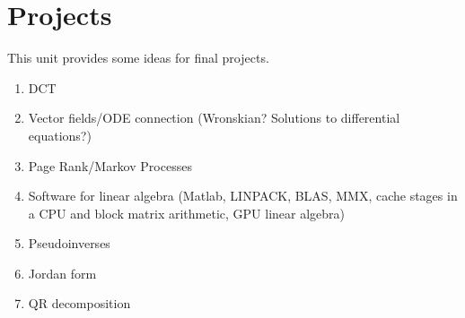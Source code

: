 \chapter{Projects}

This unit provides some ideas for final projects.

\begin{enumerate}
\item DCT
\item Vector fields/ODE connection (Wronskian?  Solutions to
  differential equations?)
\item Page Rank/Markov Processes
\item Software for linear algebra (Matlab, LINPACK, BLAS, MMX, cache
  stages in a CPU and block matrix arithmetic, GPU linear algebra)
\item Pseudoinverses
\item Jordan form
\item QR decomposition
\end{enumerate}


